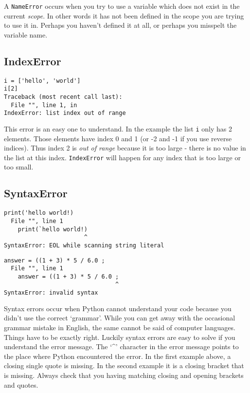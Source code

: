 A \texttt{NameError} occurs when you try to use a variable which does not exist in the current \textit{scope}. In other words                 it has not been defined in the scope you are trying to use it in. Perhaps you haven't defined it at all, or                 perhaps you misspelt the variable name.

\subsection{IndexError}

\begin{lstlisting}
i = ['hello', 'world']
i[2]
Traceback (most recent call last):
  File "", line 1, in 
IndexError: list index out of range\end{lstlisting}

This error is an easy one to understand. In the example the list \texttt{i} only has 2 elements. Those elements                 have index 0 and 1 (or -2 and -1 if you use reverse indices). Thus index 2 is \textit{out of range} because it is too large - there is no value in the list at this index.                 \texttt{IndexError} will happen for any index that is too large or too small.

\subsection{SyntaxError}

\begin{lstlisting}
print('hello world!)
  File "", line 1
    print(`hello world!)
                       ^
SyntaxError: EOL while scanning string literal
\end{lstlisting}
\begin{lstlisting}
answer = ((1 + 3) * 5 / 6.0 ;
  File "", line 1
    answer = ((1 + 3) * 5 / 6.0 ;
                                ^
SyntaxError: invalid syntax\end{lstlisting}

Syntax errors occur when Python cannot understand your code because you didn't use the correct `grammar'. While you can                 get away with the occasional grammar mistake in English, the same cannot be said of computer languages. Things have to be                 exactly right. Luckily syntax errors are easy to solve if you understand the error message. The `\textbf{\textasciicircum}' character in the error message                 points to the place where Python encountered the error. In the                 first example above, a closing single quote is missing. In the second example it is a closing bracket that is missing.                 Always check that you having matching closing and opening brackets and quotes.

